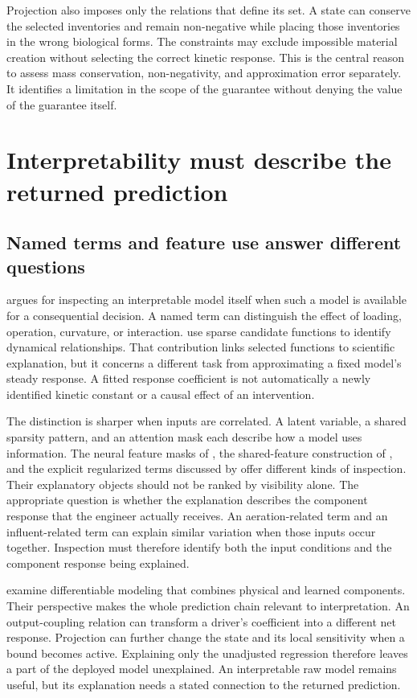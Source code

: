 Projection also imposes only the relations that define its set. A state can conserve the selected inventories and remain non-negative while placing those inventories in the wrong biological forms. The constraints may exclude impossible material creation without selecting the correct kinetic response. This is the central reason to assess mass conservation, non-negativity, and approximation error separately. It identifies a limitation in the scope of the guarantee without denying the value of the guarantee itself.

\section{Interpretability must describe the returned prediction}

\subsection{Named terms and feature use answer different questions}

\citet{Rudin2019} argues for inspecting an interpretable model itself when such a model is available for a consequential decision. A named term can distinguish the effect of loading, operation, curvature, or interaction. \citet{Brunton2016} use sparse candidate functions to identify dynamical relationships. That contribution links selected functions to scientific explanation, but it concerns a different task from approximating a fixed model's steady response. A fitted response coefficient is not automatically a newly identified kinetic constant or a causal effect of an intervention.

The distinction is sharper when inputs are correlated. A latent variable, a shared sparsity pattern, and an attention mask each describe how a model uses information. The neural feature masks of \citet{ArikPfister2021}, the shared-feature construction of \citet{Argyriou2008}, and the explicit regularized terms discussed by \citet{Hastie2009} offer different kinds of inspection. Their explanatory objects should not be ranked by visibility alone. The appropriate question is whether the explanation describes the component response that the engineer actually receives. An aeration-related term and an influent-related term can explain similar variation when those inputs occur together. Inspection must therefore identify both the input conditions and the component response being explained.

\citet{Shen2023} examine differentiable modeling that combines physical and learned components. Their perspective makes the whole prediction chain relevant to interpretation. An output-coupling relation can transform a driver's coefficient into a different net response. Projection can further change the state and its local sensitivity when a bound becomes active. Explaining only the unadjusted regression therefore leaves a part of the deployed model unexplained. An interpretable raw model remains useful, but its explanation needs a stated connection to the returned prediction.

